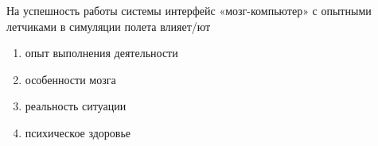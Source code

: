 
На успешность работы системы интерфейс «мозг-компьютер»  с опытными летчиками в симуляции полета влияет/ют

\begin{enumerate}
    \item опыт выполнения деятельности
    \item особенности мозга
    \item реальность ситуации
    \item психическое здоровье
\end{enumerate}

